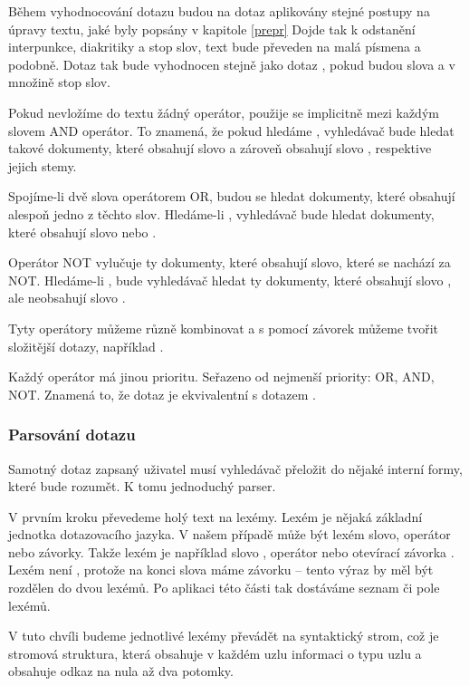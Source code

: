 \documentclass[12pt]{article}
\newcommand{\sssection}[1]{\subsubsection{#1}}
\begin{document}
Během vyhodnocování dotazu budou na dotaz aplikovány stejné postupy na úpravy textu, jaké byly popsány v kapitole \ref{prepr} Dojde tak k odstanění interpunkce, diakritiky a stop slov, text bude převeden na malá písmena a podobně. Dotaz  tak bude vyhodnocen stejně jako dotaz , pokud budou slova  a  v množině stop slov. 

Pokud nevložíme do textu žádný operátor, použije se implicitně mezi každým slovem AND operátor. To znamená, že pokud hledáme , vyhledávač bude hledat takové dokumenty, které obsahují slovo  a zároveň obsahují slovo , respektive jejich stemy. 

Spojíme-li dvě slova operátorem OR, budou se hledat dokumenty, které obsahují alespoň jedno z těchto slov. Hledáme-li , vyhledávač bude hledat dokumenty, které obsahují slovo  nebo .

Operátor NOT vylučuje ty dokumenty, které obsahují slovo, které se nachází za NOT. Hledáme-li , bude vyhledávač hledat ty dokumenty, které obsahují slovo , ale neobsahují slovo . 

Tyty operátory můžeme různě kombinovat a s pomocí závorek můžeme tvořit složitější dotazy, například . 

Každý operátor má jinou prioritu. Seřazeno od nejmenší priority: OR, AND, NOT. Znamená to, že dotaz  je ekvivalentní s dotazem .

\sssection{Parsování dotazu}

Samotný dotaz zapsaný uživatel musí vyhledávač přeložit do nějaké interní formy, které bude rozumět. K tomu jednoduchý parser. 

V prvním kroku převedeme holý text na lexémy. Lexém je nějaká základní jednotka dotazovacího jazyka. V našem případě může být lexém slovo, operátor nebo závorky. Takže lexém je například slovo , operátor  nebo otevírací závorka \uv{(}. Lexém není , protože na konci slova máme závorku -- tento výraz by měl být rozdělen do dvou lexémů. Po aplikaci této části tak dostáváme seznam či pole lexémů. 

V tuto chvíli budeme jednotlivé lexémy převádět na syntaktický strom, což je stromová struktura, která obsahuje v každém uzlu informaci o typu uzlu a obsahuje odkaz na nula až dva potomky. 
\end{document}
